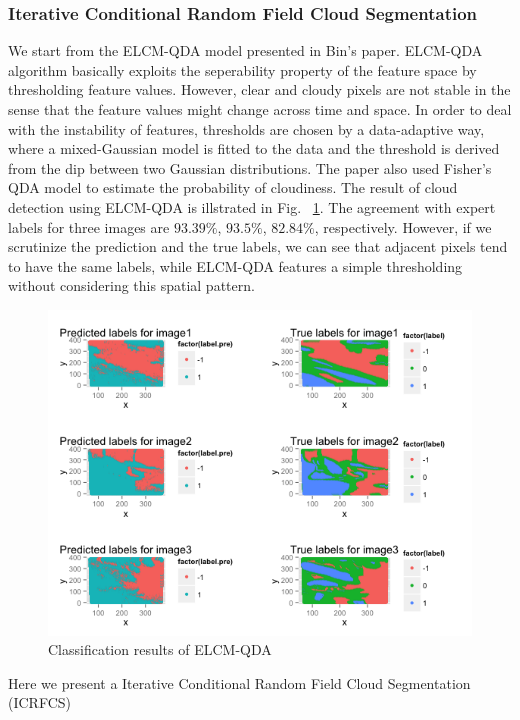 \documentclass[english]{article}\usepackage{graphicx, color}
\numberwithin{equation}{section}
\numberwithin{figure}{section}
\begin{document}
\subsubsection{Iterative Conditional Random Field Cloud Segmentation}
We start from the ELCM-QDA model presented in Bin's paper. ELCM-QDA algorithm 
basically exploits the seperability property of the feature space by 
thresholding feature values. However, clear and cloudy pixels are not stable 
in the sense that the feature values might change across time and space. In 
order to deal with the instability of features, thresholds are chosen by a 
data-adaptive way, where a mixed-Gaussian model is fitted to the data and 
the threshold is derived from the dip between two Gaussian distributions. 
The paper also used Fisher's QDA model to estimate the probability of cloudiness. 
The result of cloud detection using ELCM-QDA is illstrated in Fig. ~\ref{fig:ELCM}. 
The agreement with expert labels for three images are $93.39\%$, $93.5\%$, 
$82.84\%$, respectively. However, if we scrutinize the prediction and the true 
labels, we can  see that adjacent pixels tend to have the same labels, while 
ELCM-QDA features a simple thresholding without considering this spatial pattern.\\
\begin{figure}[!h]
  \begin{center}
    \includegraphics[width=\columnwidth]{../figures/ELCMQDA.png}
  \end{center}
  \caption{Classification results of ELCM-QDA}
  \label{fig:ELCM}
\end{figure}
Here we present a Iterative Conditional Random Field Cloud Segmentation (ICRFCS) 
\end{document}
